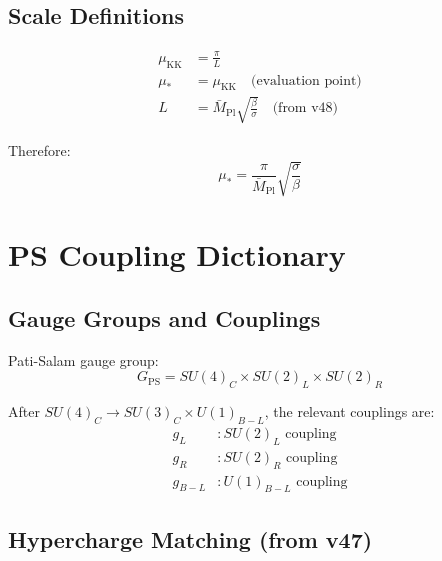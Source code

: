 \documentclass[11pt,a4paper]{article}
\begin{document}
\subsection{Scale Definitions}
\label{subsec:scale-defs}

\begin{align}
\label{eq:mu-kk-def}
\mu_{\text{KK}} &= \frac{\pi}{L} \\
\label{eq:mu-star-def}
\mu_* &= \mu_{\text{KK}} \quad \text{(evaluation point)} \\
\label{eq:L-from-edc}
L &= \bar{M}_{\text{Pl}} \sqrt{\frac{\beta}{\sigma}} \quad \text{(from v48)}
\end{align}

Therefore:
\begin{equation}
\label{eq:mu-star-explicit}
\mu_* = \frac{\pi}{\bar{M}_{\text{Pl}}} \sqrt{\frac{\sigma}{\beta}}
\end{equation}

\section{PS Coupling Dictionary}
\label{sec:ps-couplings}

\subsection{Gauge Groups and Couplings}
\label{subsec:gauge-groups}

Pati-Salam gauge group:
\begin{equation}
\label{eq:ps-group}
G_{\text{PS}} = SU(4)_C \times SU(2)_L \times SU(2)_R
\end{equation}

After $SU(4)_C \to SU(3)_C \times U(1)_{B-L}$, the relevant couplings are:
\begin{align}
\label{eq:g-L-def}
g_L &: SU(2)_L \text{ coupling} \\
\label{eq:g-R-def}
g_R &: SU(2)_R \text{ coupling} \\
\label{eq:g-BL-def}
g_{B-L} &: U(1)_{B-L} \text{ coupling}
\end{align}

\subsection{Hypercharge Matching (from v47)}
\label{subsec:hypercharge-matching}
\end{document}
